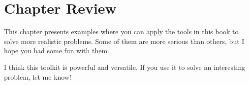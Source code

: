 \section{Chapter Review}

This chapter presents examples where you can apply the tools in this book to solve more realistic problems.  Some of them are more serious than others, but I hope you had some fun with them.

I think this toolkit is powerful and versatile.  If you use it to solve an interesting problem, let me know!

